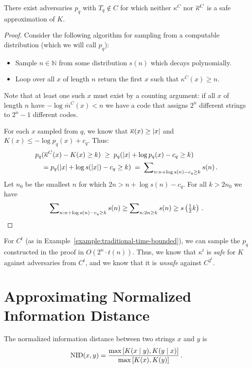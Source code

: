 \begin{theorem} 
There exist adversaries $p_q$ with $T_q \notin C$ for which neither $\kappa^C$ nor ${\overline{\kappa}}^C$ is a safe approximation of $K$. 
\label{theorem:unsafe-outside}
\end{theorem}
\begin{proof}
Consider the following algorithm for sampling from a computable distribution (which we will call $p_q$):
\begin{itemize}
\item Sample $n \in {\mathbb N}$ from some distribution $s(n)$ which decays polynomially. 
\item Loop over all $x$ of length $n$ return the first $x$ such that $\kappa^C(x) \geq n$. 
\end{itemize}
Note that at least one such $x$ must exist by a counting argument: if all $x$ of length $n$ have  $-\log \overline{m}^C(x) < n$ we have a code that assigns $2^n$ different strings to $2^n-1$ different codes.

For each $x$ sampled from $q$, we know that ${\overline{\kappa}}(x) \geq |x|$ and $K(x) \leq -\log p_q(x) + c_q$. Thus: 
\begin{align*}
p_q&({\overline{\kappa}}^C(x) - K(x) \geq k) \;\geq\; p_q(|x| + \log p_q(x) - c_q \geq k) \\
&= p_q(|x| + \log s(|x|) - c_q \geq k) \;=\; \sum\nolimits_{n:n + \log s(n) - c_q \geq k} s(n)\,\text{.}
\end{align*}
Let $n_0$ be the smallest $n$ for which $2n > n + \log s(n) - c_q$. For all $k > 2n_0$ we have \belowdisplayskip=-12pt
\begin{align*}
\sum\nolimits_{n:n + \log s(n) - c_q \geq k} s(n) \geq \sum\nolimits_{n: 2n \geq k} s(n) \geq s\left(\tfrac{1}{2} k\right)\,\text{.}
\end{align*}
\end{proof}
For $C^t$ (as in Example~\ref{example:traditional-time-bounded}), we can sample the $p_q$ constructed in the proof in $O(2^n\cdot t(n))$. Thus, we know that $\kappa^t$ is \emph{safe} for $K$ against adversaries from $C^t$, and we know that it is \emph{unsafe} against $C^{2^t}$.
\section{Approximating Normalized Information Distance}

\begin{definition}
The normalized information distance between two strings $x$ and $y$ is 
\[
\text{NID}(x, y) = \frac{\max \left [ K(x\mid y), K(y\mid x)\right ]}{\max \left [K(x), K(y)\right ]} \,\text{.}
\]
\label{definition:nid}
\end{definition}

